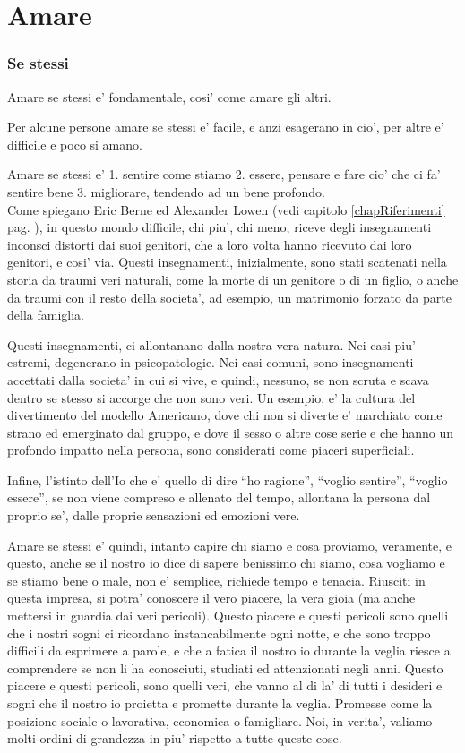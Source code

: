 \section{Amare}
\label{amareSe}


\subsubsection{Se stessi}
Amare se stessi e' fondamentale, cosi' come amare gli altri.

Per alcune persone amare se stessi e' facile, e anzi esagerano in cio', per altre e' difficile e poco si amano.

Amare se stessi e' 1. sentire come stiamo 2. essere, pensare e fare cio' che ci fa' sentire bene 3. migliorare, tendendo ad un bene profondo.\\

Come spiegano Eric Berne ed Alexander Lowen (vedi capitolo \ref{chapRiferimenti} pag. \pageref{chapRiferimenti}), in questo mondo difficile, chi piu', chi meno, riceve degli insegnamenti inconsci distorti dai suoi genitori, che a loro volta hanno ricevuto dai loro genitori, e cosi' via. Questi insegnamenti, inizialmente, sono stati scatenati nella storia da traumi veri naturali, come la morte di un genitore o di un figlio, o anche da traumi con il resto della societa', ad esempio, un matrimonio forzato da parte della famiglia.

Questi insegnamenti, ci allontanano dalla nostra vera natura. Nei casi piu' estremi, degenerano in psicopatologie. Nei casi comuni, sono insegnamenti accettati dalla societa' in cui si vive, e quindi, nessuno, se non scruta e scava dentro se stesso si accorge che non sono veri. Un esempio, e' la cultura del divertimento del modello Americano, dove chi non si diverte e' marchiato come strano ed emerginato dal gruppo, e dove il sesso o altre cose serie e che hanno un profondo impatto nella persona, sono considerati come piaceri superficiali.

Infine, l'istinto dell'Io che e' quello di dire ``ho ragione'', ``voglio sentire'', ``voglio essere'', se non viene compreso e allenato del tempo, allontana la persona dal proprio se', dalle proprie sensazioni ed emozioni vere.

Amare se stessi e' quindi, intanto capire chi siamo e cosa proviamo, veramente, e questo, anche se il nostro io dice di sapere benissimo chi siamo, cosa vogliamo e se stiamo bene o male, non e' semplice, richiede tempo e tenacia. Riusciti in questa impresa, si potra' conoscere il vero piacere, la vera gioia (ma anche mettersi in guardia dai veri pericoli). Questo piacere e questi pericoli sono quelli che i nostri sogni ci ricordano instancabilmente ogni notte, e che sono troppo difficili da esprimere a parole, e che a fatica il nostro io durante la veglia riesce a comprendere se non li ha conosciuti, studiati ed attenzionati negli anni. Questo piacere e questi pericoli, sono quelli veri, che vanno al di la' di tutti i desideri e sogni che il nostro io proietta e promette durante la veglia. Promesse come la posizione sociale o lavorativa, economica o famigliare. Noi, in verita', valiamo molti ordini di grandezza in piu' rispetto a tutte queste cose.

